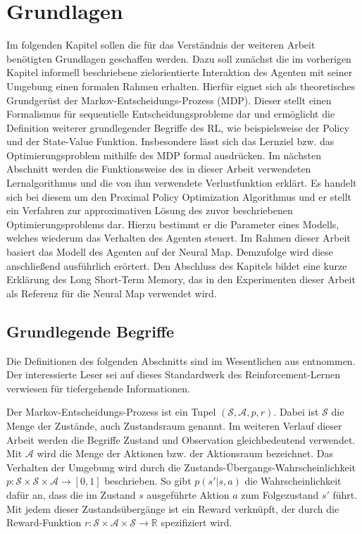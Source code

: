 \chapter{Grundlagen}
\label{chap_basics}

Im folgenden Kapitel sollen die für das Verständnis der weiteren Arbeit benötigten Grundlagen geschaffen werden. Dazu soll zunächst die im vorherigen Kapitel informell beschriebene zielorientierte Interaktion des Agenten mit seiner Umgebung einen formalen Rahmen erhalten. Hierfür eignet sich als theoretisches Grundgerüst der Markov-Entscheidungs-Prozess (MDP). Dieser stellt einen Formalismus für sequentielle Entscheidungsprobleme dar und ermöglicht die Definition weiterer grundlegender Begriffe des RL, wie beispielsweise der Policy und der State-Value Funktion. Insbesondere lässt sich das Lernziel bzw. das Optimierungsproblem mithilfe des MDP formal ausdrücken. Im nächsten Abschnitt werden die Funktionsweise des in dieser Arbeit verwendeten Lernalgorithmus und die von ihm verwendete Verlustfunktion erklärt. Es handelt sich bei diesem um den Proximal Policy Optimization Algorithmus und er stellt ein Verfahren zur approximativen Lösung des zuvor beschriebenen Optimierungsproblems dar. Hierzu bestimmt er die Parameter eines Modells, welches wiederum das Verhalten des Agenten steuert. Im Rahmen dieser Arbeit basiert das Modell des Agenten auf der Neural Map. Demzufolge wird diese anschließend ausführlich erörtert. Den Abschluss des Kapitels bildet eine kurze Erklärung des Long Short-Term Memory, das in den Experimenten dieser Arbeit als Referenz für die Neural Map verwendet wird.


\section{Grundlegende Begriffe}
\label{sec_basics}

Die Definitionen des folgenden Abschnitts sind im Wesentlichen aus \cite{SuttonBarto} entnommen. Der interessierte Leser sei auf dieses Standardwerk des Reinforcement-Lernen verwiesen für tiefergehende Informationen.

Der Markov-Entscheidungs-Prozess ist ein Tupel $(\mathcal{S, A}, p, r)$. Dabei ist $\mathcal{S}$ die Menge der Zustände, auch Zustandsraum genannt. Im weiteren Verlauf dieser Arbeit werden die Begriffe Zustand und Observation gleichbedeutend verwendet. Mit $\mathcal{A}$ wird die Menge der Aktionen bzw. der Aktionsraum bezeichnet. Das Verhalten der Umgebung wird durch die Zustands-Übergangs-Wahrscheinlichkeit $p: \mathcal{S} \times \mathcal{S} \times \mathcal{A} \to [0,1]$ beschrieben. So gibt $p(s'|s,a)$ die Wahrscheinlichkeit dafür an, dass die im Zustand $s$ ausgeführte Aktion $a$  zum Folgezustand $s'$ führt. Mit jedem dieser Zustandsübergänge ist ein Reward verknüpft, der durch die Reward-Funktion $r: \mathcal{S} \times \mathcal{A} \times \mathcal{S} \to \mathbb{R}$ spezifiziert wird.

